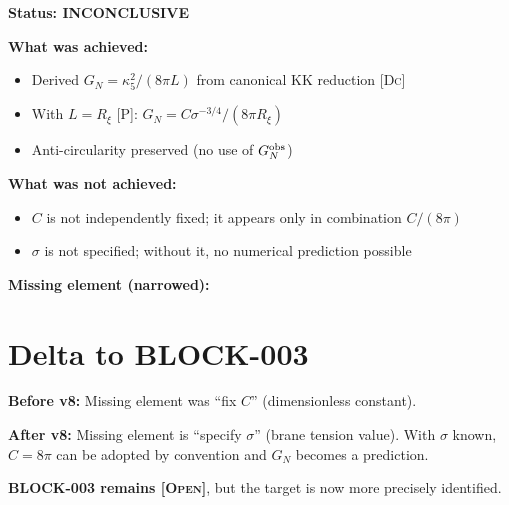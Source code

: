 \documentclass[11pt,a4paper]{article}
\newcommand{\Post}{\textsc{[P]}}
\newcommand{\Deriv}{\textsc{[Dc]}}
\newcommand{\Open}{\textsc{[Open]}}
\begin{document}
\begin{outcomebox}
\textbf{Status: INCONCLUSIVE}

\textbf{What was achieved:}
\begin{itemize}
\item Derived $G_N = \kappa_5^2 / (8\pi L)$ from canonical KK reduction \Deriv
\item With $L = R_\xi$ \Post: $G_N = C \sigma^{-3/4} / (8\pi R_\xi)$
\item Anti-circularity preserved (no use of $G_N^{\rm obs}$)
\end{itemize}

\textbf{What was not achieved:}
\begin{itemize}
\item $C$ is not independently fixed; it appears only in combination $C/(8\pi)$
\item $\sigma$ is not specified; without it, no numerical prediction possible
\end{itemize}

\textbf{Missing element (narrowed):}
\begin{center}
\end{center}
\end{outcomebox}

\section{Delta to BLOCK-003}

\textbf{Before v8:} Missing element was ``fix $C$'' (dimensionless constant).

\textbf{After v8:} Missing element is ``specify $\sigma$'' (brane tension
value). With $\sigma$ known, $C = 8\pi$ can be adopted by convention and
$G_N$ becomes a prediction.

\textbf{BLOCK-003 remains \Open}, but the target is now more precisely
identified.
\end{document}
